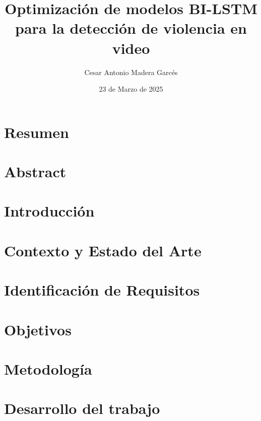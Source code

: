 \documentclass[11pt,a4paper,spanish]{book}
\title{Optimización de modelos BI-LSTM para la detección de violencia en video}
\author{Cesar Antonio Madera Garcés}
\date{23 de Marzo de 2025}
\numberwithin{equation}{chapter}
\numberwithin{figure}{chapter}
\begin{document}
\renewcommand{\listfigurename}{Índice de Ilustraciones}
\renewcommand{\listtablename}{Índice de Tablas}
\renewcommand{\contentsname}{Índice de Contenidos}
\renewcommand{\figurename}{Figura}
\renewcommand{\tablename}{Tabla} 

\maketitle

\frontmatter
\tableofcontents
\listoffigures
\listoftables

\chapter{Resumen}




\chapter{Abstract}


\mainmatter
\chapter{Introducción}



\chapter{Contexto y Estado del Arte}


\chapter{Identificación de Requisitos}


\chapter{Objetivos}


\chapter{Metodología}


\chapter{Desarrollo del trabajo}

\end{document}
